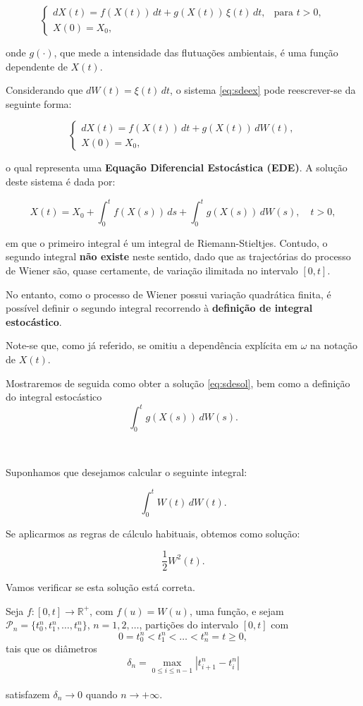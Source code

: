\documentclass[
  11pt,
  a4paper,
]{book}
\theoremstyle{definition}
\theoremstyle{definition}
\theoremstyle{definition}
\theoremstyle{definition}
\theoremstyle{remark}
\begin{document}
\[
\begin{cases}
dX(t) = f(X(t))\,dt + g(X(t))\,\xi(t)\,dt, & \text{para } t > 0, \\
X(0) = X_0, &
\end{cases}
\label{eq:sdeex}
\]

onde \(g(\cdot)\), que mede a intensidade das flutuações ambientais, é uma função dependente de \(X(t)\).

Considerando que \(dW(t) = \xi(t)\,dt\), o sistema \eqref{eq:sdeex} pode reescrever-se da seguinte forma:

\[
\begin{cases}
dX(t) = f(X(t))\,dt + g(X(t))\,dW(t), \\
X(0) = X_0,
\end{cases}
\]

o qual representa uma \textbf{Equação Diferencial Estocástica (EDE)}. A solução deste sistema é dada por:

\[
X(t) = X_0 + \int_{0}^{t} f(X(s))\,ds + \int_{0}^{t} g(X(s))\,dW(s), \quad t > 0,
\label{eq:sdesol}
\]

em que o primeiro integral é um integral de Riemann-Stieltjes. Contudo, o segundo integral \textbf{não existe} neste sentido, dado que as trajectórias do processo de Wiener são, quase certamente, de variação ilimitada no intervalo \([0,t]\).

No entanto, como o processo de Wiener possui variação quadrática finita, é possível definir o segundo integral recorrendo à \textbf{definição de integral estocástico}.

Note-se que, como já referido, se omitiu a dependência explícita em \(\omega\) na notação de \(X(t)\).

Mostraremos de seguida como obter a solução \eqref{eq:sdesol}, bem como a definição do integral estocástico
\[
\int_{0}^{t} g(X(s))\,dW(s).
\]

\(\,\)

Suponhamos que desejamos calcular o seguinte integral:

\[
\int_{0}^{t} W(t)\,dW(t).
\]

Se aplicarmos as regras de cálculo habituais, obtemos como solução:

\[
\frac{1}{2}W^2(t).
\label{eq:solintw}
\]

Vamos verificar se esta solução está correta.

Seja \(f:[0,t] \rightarrow \mathbb{R}^{+}\), com \(f(u) = W(u)\), uma função, e sejam \(\mathcal{P}_n = \{t_0^n, t_1^n, \ldots, t_n^n\}\), \(n = 1,2,\ldots\), partições do intervalo \([0,t]\) com\\
\[
0 = t_0^n < t_1^n < \ldots < t_n^n = t \geq 0,
\]
tais que os diâmetros\\
\[
\delta_n = \max_{0 \leq i \leq n-1} |t_{i+1}^n - t_i^n|
\]\\
satisfazem \(\delta_n \to 0\) quando \(n \to +\infty\).
\end{document}
